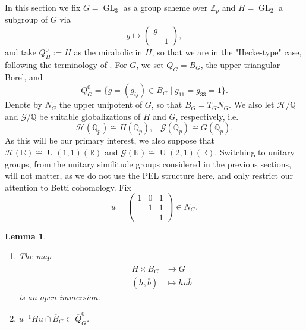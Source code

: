 \documentclass[12pt,a4paper,reqno]{amsart}
\theoremstyle{definition}
\numberwithin{definition}{subsection}
\theoremstyle{definition}
\numberwithin{Definition}{subsection}
\theoremstyle{remark}
\theoremstyle{remark}
\numberwithin{Remark}{subsection}
\theoremstyle{remark}
\theoremstyle{plain}
\numberwithin{Theorem}{subsection}
\theoremstyle{plain}
\theoremstyle{plain}
\theoremstyle{plain}
\theoremstyle{plain}
\newtheorem{Lemma}[Theorem]{Lemma}
\theoremstyle{plain}
\theoremstyle{plain}
\theoremstyle{plain}
\newcommand*{\Z}{\mathbb{Z}}
\newcommand*{\Q}{\mathbb{Q}}
\newcommand*{\R}{\mathbb{R}}
\DeclareMathOperator{\GL}{GL}
\DeclareMathOperator{\U}{U}
\begin{document}
In this section we fix $G=\GL_3$ as a group scheme over $\Z_p$ and $H=\GL_2$ a subgroup of $G$ via
\begin{equation*}
g\mapsto \begin{pmatrix}
g &\\
& 1
\end{pmatrix},
\end{equation*}
and take $Q^0_H:=H$ as the mirabolic in $H$, so that we are in the "Hecke-type" case, following the terminology of \cite[\S 5]{loeffler}. For $G$, we set $Q_G=B_G$, the upper triangular Borel, and
\[
Q^0_G=\{g=(g_{ij})\in B_G\mid g_{11}=g_{33}=1\}.
\]
Denote by $N_G$ the upper unipotent of $G$, so that $B_G=T_GN_G$. We also let $\mathcal{H}/\Q$ and $\mathcal{G}/\Q$ be suitable globalizations of $H$ and $G$, respectively, i.e.
\[
\mathcal{H}(\Q_p)\cong H(\Q_p),\;\;\; \mathcal{G}(\Q_p)\cong G(\Q_p).
\]
As this will be our primary interest, we also suppose that $\mathcal{H}(\R)\cong \U(1,1)(\R)$ and $\mathcal{G}(\R)\cong \U(2,1)(\R)$. Switching to unitary groups, from the unitary similitude groups considered in the previous sections, will not matter, as we do not use the PEL structure here, and only restrict our attention to Betti cohomology.  Fix $$u=\begin{pmatrix}
1&0&1\\
&1&1\\
&&1
\end{pmatrix}\in N_G.$$
\begin{Lemma}
\label{46}
\begin{enumerate} 
\item The map 
\begin{align*}
H\times \overline{B}_G&\to G\\
(h,\overline{b})&\mapsto hu\overline{b}
\end{align*}
is an open immersion.
\item $u^{-1}Hu\cap \overline{B}_G\subset \overline{Q}^0_G$.
\end{enumerate}
\end{Lemma}
\end{document}
